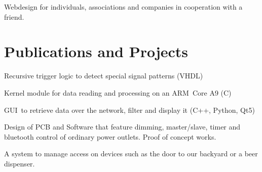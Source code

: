 \documentclass[]{deedy-resume-openfont}
\begin{document}
\begin{minipage}[t]{0.66\textwidth}
Webdesign for individuals, associations and companies in cooperation with a friend.
\sectionsep


\section{Publications and Projects}

\vspace{\topsep} %
\begin{tightemize}
\item Recursive trigger logic to detect special signal patterns (VHDL)
\item Kernel module for data reading and processing on an ARM Core A9 (C)
\item GUI to retrieve data over the network, filter and display it (C++, Python, Qt5)
\end{tightemize}
\sectionsep

Design of PCB and Software that feature dimming, master/slave, timer and bluetooth control of ordinary power outlets. Proof of concept works.
\sectionsep

A system to manage access on devices such as the door to our backyard or a beer dispenser.
\sectionsep


\end{minipage}
\end{document}
